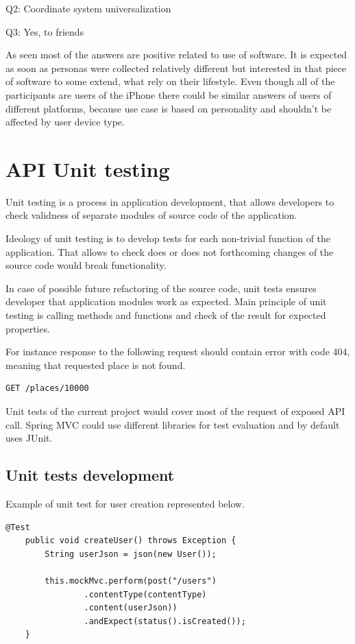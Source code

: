 \documentclass[thesis=M,english]{FITthesis}[2012/10/20]
\begin{document}
Q2: Coordinate system universalization

Q3: Yes, to friends

As seen most of the answers are positive related to use of software. It is expected as soon as personas were collected relatively different but interested in that piece of software to some extend, what rely on their lifestyle. Even though all of the participants are users of the iPhone there could be similar answers of users of different platforms, because use case is based on personality and shouldn't be affected by user device type.

\section{API Unit testing}

Unit testing is a process in application development, that allows developers to check validness of separate modules of source code of the application.

Ideology of unit testing is to develop tests for each non-trivial function of the application. That allows to check does or does not forthcoming changes of the source code would break functionality.

In case of possible future refactoring of the source code, unit tests ensures developer that application modules work as expected. Main principle of unit testing is calling methods and functions and check of the result for expected properties.

For instance response to the following request should contain error with code 404, meaning that requested place is not found.

\begin{lstlisting}
GET /places/10000 
\end{lstlisting}


Unit tests of the current project would cover most of the request of exposed API call. Spring MVC could use different libraries for test evaluation and by default uses JUnit.

\subsection{Unit tests development}

Example of unit test for user creation represented below.

\begin{lstlisting}
@Test
    public void createUser() throws Exception {
        String userJson = json(new User());
        
        this.mockMvc.perform(post("/users")
                .contentType(contentType)
                .content(userJson))
                .andExpect(status().isCreated());
    }
\end{lstlisting}
\end{document}
